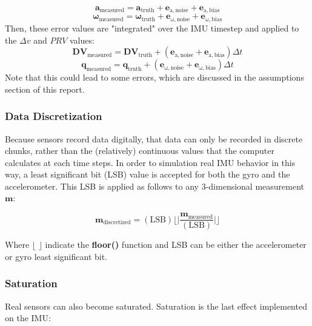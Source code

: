 \begin{equation}
\mathbf{a}_{\mathrm{measured}} = \mathbf{a}_{\mathrm{truth}} + \mathbf{e}_{\mathrm{a,noise}} + \mathbf{e}_{\mathrm{a, bias}}
\end{equation}
\begin{equation}
\bm{\omega}_{\mathrm{measured}} = \bm{\omega}_{\mathrm{truth}} + \mathbf{e}_{\mathrm{\omega,noise}} + \mathbf{e}_{\mathrm{\omega, bias}}
\end{equation}
Then, these error values are "integrated" over the IMU timestep and applied to the $\Delta v$ and $PRV$ values:
\begin{equation}
\mathbf{DV}_{\mathrm{measured}} = \mathbf{DV}_{\mathrm{truth}} + (\mathbf{e}_{\mathrm{a,noise}} + \mathbf{e}_{\mathrm{a, bias}})\Delta t
\end{equation}
\begin{equation}
\mathbf{q}_{\mathrm{measured}} = \mathbf{q}_{\mathrm{truth}} + (\mathbf{e}_{\mathrm{\omega,noise}} + \mathbf{e}_{\mathrm{\omega, bias}})\Delta t
\end{equation}
Note that this could lead to some errors, which are discussed in the assumptions section of this report.


\subsubsection{Data Discretization}
Because sensors record data digitally, that data can only be recorded in discrete chunks, rather than the (relatively) continuous values that the computer calculates at each time steps. In order to simulation real IMU behavior in this way, a least significant bit (LSB) value is accepted for both the gyro and the accelerometer. This LSB is applied as follows to any 3-dimensional measurement $\mathbf{m}$:

\begin{equation}
\mathbf{m}_{\mathrm{discretized}} = (\mathrm{LSB})\Biggl\lfloor\Biggl|\frac{\mathbf{m}_{\mathrm{measured}}}{(\mathrm{LSB})}\Biggr|\Biggr\rfloor
\end{equation}

Where $\lfloor$  $\rfloor$ indicate the \textbf{floor()} function and LSB can be either the accelerometer or gyro least significant bit.

\subsubsection{Saturation}
Real sensors can also become saturated. Saturation is the last effect implemented on the IMU:

